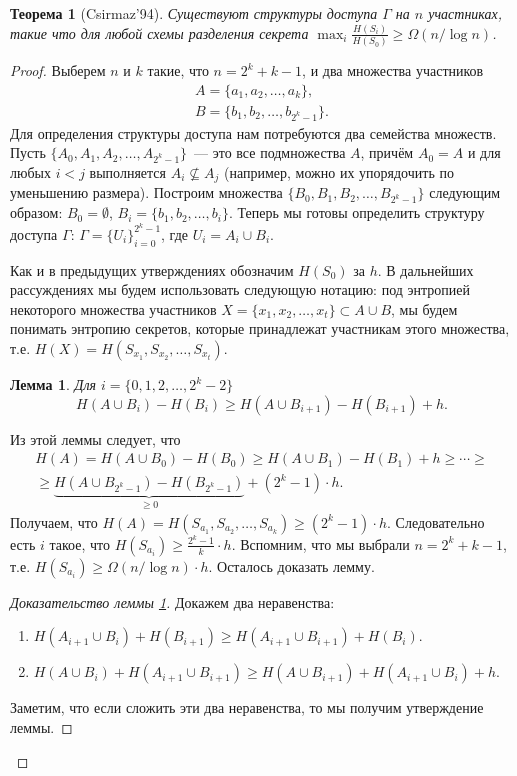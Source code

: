 \documentclass[12pt]{article}
\newcommand{\seqn}[2]{{#1}_1,{#1}_2,\dotsc,{#1}_{#2}}
\newcommand{\seqin}[3]{{#1}_{{#2}_1},{#1}_{{#2}_2},\dotsc,{#1}_{{#2}_{#3}}}
\theoremstyle{definition}
\theoremstyle{plain}
\newtheorem{theorem}{Теорема}[section]
\newtheorem{lemma}{Лемма}[section]
\theoremstyle{remark}
\begin{document}
\begin{theorem}[Csirmaz'94]
    Существуют структуры доступа $\Gamma$ на $n$ участниках, такие что для любой схемы разделения
    секрета $\max_i\frac{H(S_i)}{H(S_0)} \ge \Omega(n/\log n)$.
\end{theorem}
\begin{proof}
    Выберем $n$ и $k$ такие, что $n = 2^k + k - 1$, и два множества участников 
    \[
        \begin{array}{l}
            A = \{\seqn{a}{k}\},\\
            B = \{\seqn{b}{2^k - 1}\}.
        \end{array}
    \]
    Для определения структуры доступа нам потребуются два семейства множеств. 
    Пусть $\{A_0,\seqn{A}{2^k-1}\}$~--- это все подмножества $A$, причём $A_0 = A$ и для любых
    $i < j$ выполняется $A_i\not\subseteq A_j$ (например, можно их упорядочить по уменьшению
    размера). Построим множества $\{B_0,\seqn{B}{2^k - 1}\}$ следующим образом: $B_0 = \emptyset$, 
    $B_i = \{\seqn{b}{i}\}$.  
    Теперь мы готовы определить структуру доступа $\Gamma$: $\Gamma = \{U_i\}_{i=0}^{2^k-1}$, где $U_i =
    A_i\cup B_i$. 
    
    Как и в предыдущих утверждениях обозначим $H(S_0)$ за $h$.
    В дальнейших рассуждениях мы будем использовать следующую нотацию: под энтропией некоторого
    множества участников $X = \{\seqn{x}{t}\}\subset A\cup B$, мы будем понимать энтропию секретов, которые
    принадлежат участникам этого множества, т.е. $H(X) = H(\seqin{S}{x}{t})$.

    \begin{lemma}\label{lm:secretlb} Для $i=\{0,1,2,\dots,2^k-2\}$
        \[
            H(A\cup B_i) - H(B_i) \ge H(A\cup B_{i+1}) - H(B_{i+1}) + h.
        \]
    \end{lemma}
    Из этой леммы следует, что 
    \begin{multline*}
        H(A) = H(A\cup B_0) - H(B_0) \ge H(A\cup B_{1}) - H(B_1) + h \ge \dotsb \ge\\
        \ge \underbrace{H(A\cup B_{2^k-1}) - H(B_{2^k-1})}_{\ge 0} + (2^k - 1)\cdot h.
    \end{multline*}
    Получаем, что $H(A) = H(\seqin{S}{a}{k})\ge (2^k - 1) \cdot h$. Следовательно есть $i$ такое,
    что $H(S_{a_i})\ge \frac{2^k - 1}{k}\cdot h$.
    Вспомним, что мы выбрали $n = 2^k + k - 1$, т.е. $H(S_{a_i})\ge \Omega(n/\log n) \cdot h$.
    Осталось доказать лемму.
    \begin{proof}[Доказательство леммы \ref{lm:secretlb}]
        Докажем два неравенства:
        \begin{enumerate}
            \item $H(A_{i+1}\cup B_i) + H(B_{i+1}) \ge  H(A_{i+1} \cup B_{i+1}) + H(B_i) $.
            \item $H(A\cup B_i) + H(A_{i+1}\cup B_{i+1}) \ge H(A\cup B_{i+1}) + H(A_{i+1}\cup B_i) + h$.
        \end{enumerate}
        Заметим, что если сложить эти два неравенства, то мы получим утверждение леммы.
    

\end{proof}
\end{proof}
\end{document}
